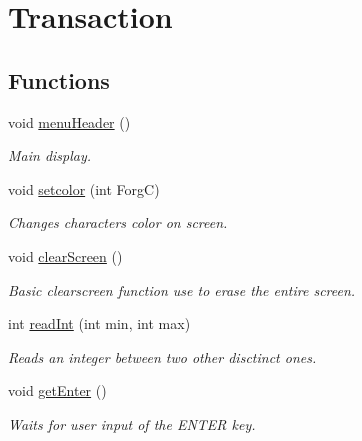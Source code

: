 \hypertarget{group___utilities}{}\section{Transaction}
\label{group___utilities}
\subsection*{Functions}
\begin{DoxyCompactItemize}
\item 
void \hyperlink{group___utilities_ga1f9f149ec48673e7862677749634b84f}{menu\+Header} ()
\begin{DoxyCompactList}\small\item\em Main display. \end{DoxyCompactList}\item 
void \hyperlink{group___utilities_gafacdcb839eb529bcd4fcf232bc342a8f}{setcolor} (int ForgC)
\begin{DoxyCompactList}\small\item\em Changes characters color on screen. \end{DoxyCompactList}\item 
\mbox{\label{group___utilities_ga9d7e8af417b6d543da691e9c0e2f6f9f}} 
void \hyperlink{group___utilities_ga9d7e8af417b6d543da691e9c0e2f6f9f}{clear\+Screen} ()
\begin{DoxyCompactList}\small\item\em Basic clearscreen function use to erase the entire screen. \end{DoxyCompactList}\item 
int \hyperlink{group___utilities_ga8c6fba7e77f37f05bdf1369f9e89ca0d}{read\+Int} (int min, int max)
\begin{DoxyCompactList}\small\item\em Reads an integer between two other disctinct ones. \end{DoxyCompactList}\item 
\mbox{\label{group___utilities_gaee81db935b67b9fad8c5f25b02ba935e}} 
void \hyperlink{group___utilities_gaee81db935b67b9fad8c5f25b02ba935e}{get\+Enter} ()
\begin{DoxyCompactList}\small\item\em Waits for user input of the E\+N\+T\+ER key. \end{DoxyCompactList}\end{DoxyCompactItemize}
